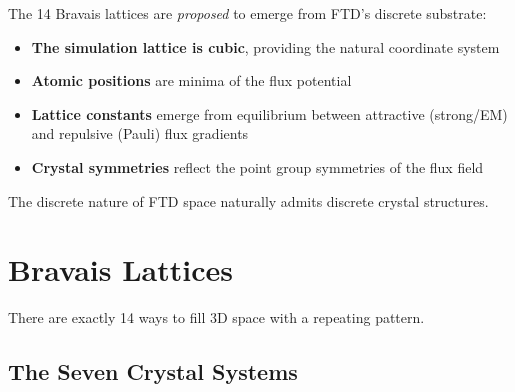\documentclass[
  11pt,
  letterpaper,
  twoside,
  openright]{book}
\providecommand{\tightlist}{%
  \setlength{\itemsep}{0pt}\setlength{\parskip}{0pt}}
\begin{document}
\begin{tcolorbox}[enhanced jigsaw, leftrule=.75mm, title=\textcolor{quarto-callout-note-color}{\faInfo}\hspace{0.5em}{How FTD Proposes Crystal Structure {[}CONJECTURE{]}}, bottomrule=.15mm, opacityback=0, coltitle=black, arc=.35mm, colframe=quarto-callout-note-color-frame, colbacktitle=quarto-callout-note-color!10!white, colback=white, titlerule=0mm, breakable, bottomtitle=1mm, toptitle=1mm, rightrule=.15mm, toprule=.15mm, left=2mm, opacitybacktitle=0.6]

The 14 Bravais lattices are \emph{proposed} to emerge from FTD's
discrete substrate:

\begin{itemize}
\tightlist
\item
  \textbf{The simulation lattice is cubic}, providing the natural
  coordinate system
\item
  \textbf{Atomic positions} are minima of the flux potential
\item
  \textbf{Lattice constants} emerge from equilibrium between attractive
  (strong/EM) and repulsive (Pauli) flux gradients
\item
  \textbf{Crystal symmetries} reflect the point group symmetries of the
  flux field
\end{itemize}

The discrete nature of FTD space naturally admits discrete crystal
structures.

\end{tcolorbox}

\section{Bravais Lattices}\label{bravais-lattices}

There are exactly 14 ways to fill 3D space with a repeating pattern.

\subsection{The Seven Crystal Systems}\label{the-seven-crystal-systems}
\end{document}
